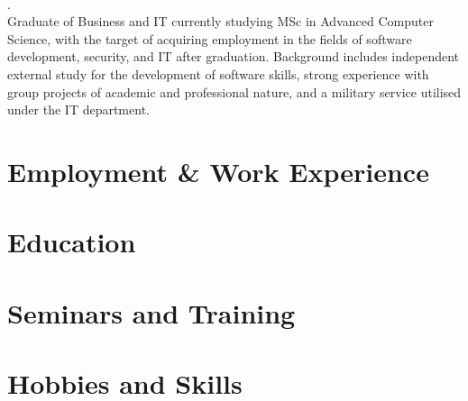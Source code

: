 \documentclass{template}
\begin{document}
\thispagestyle{empty}
\pagestyle{fancy}

\centering

\\
.
\\
\justify
Graduate of Business and IT currently studying MSc in Advanced Computer Science, with the target of acquiring employment in the fields of software development, security, and IT after graduation. Background includes independent external study for the development of software skills, strong experience with group projects of academic and professional nature, and a military service utilised under the IT department.

\section{Employment \& Work Experience}


\section{Education}


\section{Seminars and Training}


\section{Hobbies and Skills}

\end{document}
